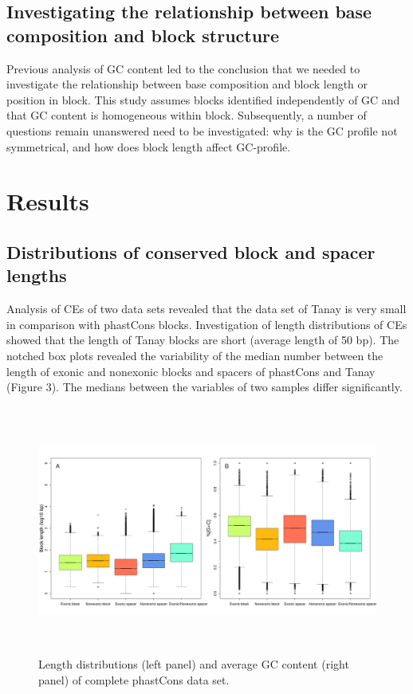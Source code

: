 \documentclass[12pt]{report}
\begin{document}
\subsection{Investigating the relationship between base composition and block structure}
Previous analysis of GC content led to the conclusion that we needed to investigate the relationship between base composition and block length or position in block. This study assumes blocks identified independently of GC and that GC content is homogeneous within block. Subsequently, a number of questions remain unanswered need to be investigated: why is the GC profile not symmetrical, and how does block length affect GC-profile.

\newpage
\section{Results}
\subsection{Distributions of conserved block and spacer lengths}
Analysis of CEs of two data sets revealed that the data set of Tanay is very small in comparison with phastCons blocks. Investigation of length distributions of CEs showed that the length of Tanay blocks are short (average length of 50 bp). The notched box plots revealed the variability of the median number between the length of exonic and nonexonic blocks and spacers of phastCons and Tanay (Figure 3). The medians between the variables of two samples differ significantly.\\

\begin{figure}[htbp]
\centering
\includegraphics[width=\textwidth, height=82mm]{whole_phastcons_lenghts_GC_latex}
\caption{Length distributions (left panel) and average GC content (right panel) of complete phastCons data set.}
\label{fig:blocks_spacers_distributions_phast}
\end{figure}
\end{document}
